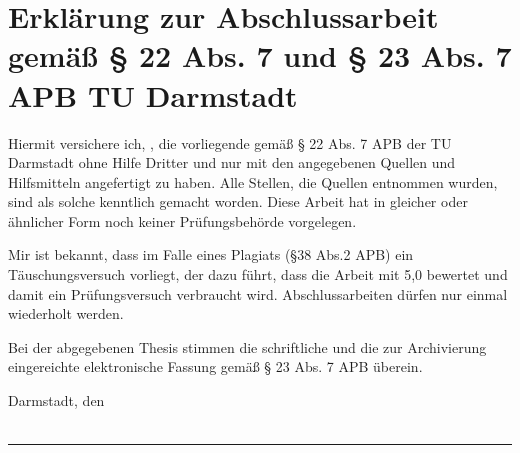 \chapter*{Erklärung zur Abschlussarbeit gemäß § 22 Abs. 7 und § 23 Abs. 7 APB TU Darmstadt }

Hiermit versichere ich, \yourName{}, die vorliegende \yourCourseOfStudies{} gemäß § 22 Abs. 7 APB der TU Darmstadt ohne Hilfe Dritter und nur mit den angegebenen Quellen und Hilfsmitteln angefertigt zu haben. Alle Stellen, die Quellen entnommen wurden, sind als solche kenntlich gemacht worden. Diese Arbeit hat in gleicher oder ähnlicher Form noch keiner Prüfungsbehörde vorgelegen.  

Mir ist bekannt, dass im Falle eines Plagiats (§38 Abs.2 APB) ein Täuschungsversuch vorliegt, der dazu führt, dass die Arbeit mit 5,0 bewertet und damit ein Prüfungsversuch verbraucht wird. Abschlussarbeiten dürfen nur einmal wiederholt werden. 

Bei der abgegebenen Thesis stimmen die schriftliche und die zur Archivierung eingereichte elektronische Fassung gemäß § 23 Abs. 7 APB überein. 

\vspace{2cm}
\hfill \parbox{6cm}{Darmstadt, den \yourSubmissionDate{} \\ \\ \phantom{.}}
\parbox{6cm}{\centering\hrule\medskip \yourName{}}
